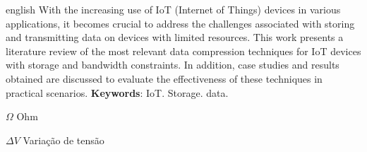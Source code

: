 \documentclass{TCC_UP}
\begin{document}
    \begin{resumo}[Abstract]
     \begin{otherlanguage*}{english}
With the increasing use of IoT (Internet of Things) devices in various applications, it becomes crucial to address the challenges associated with storing and transmitting data on devices with limited resources. This work presents a literature review of the most relevant data compression techniques for IoT devices with storage and bandwidth constraints. In addition, case studies and results obtained are discussed to evaluate the effectiveness of these techniques in practical scenarios.
       \textbf{Keywords}: IoT. Storage. data.
     \end{otherlanguage*}
    \end{resumo}

    \listoffigures*
    \cleardoublepage

    \listofgraficos*
    \cleardoublepage

    \listofquadros*
    \cleardoublepage

    \listoftables*
    \cleardoublepage

    \printnomenclature
    \cleardoublepage

    \begin{simbolos}
      \item[$ \Omega $] Ohm
      \item[$ \Delta V $] Variação de tensão
    \end{simbolos}
\end{document}
